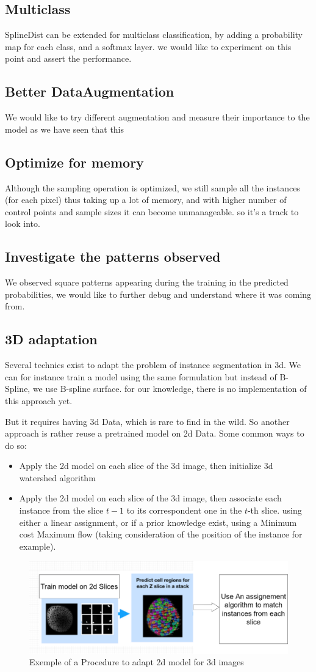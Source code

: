 \documentclass[main.tex]{subfiles}
\begin{document}
\subsection{Multiclass}
SplineDist can be extended for multiclass classification, by adding a probability map for each class, and a softmax layer. we would like to experiment on this point and assert the performance.
\subsection{Better DataAugmentation}
We would like to try different augmentation and measure their importance to the model as we have seen that this 
\subsection{Optimize for memory}
Although the sampling operation is optimized, we still sample all the instances (for each pixel) thus taking up a lot of memory, and with higher number of control points and sample sizes it can become unmanageable. so it's a track to look into.
\subsection{Investigate the patterns observed}
We observed square patterns appearing during the training in the predicted probabilities, we would like to further debug and understand where it was coming from. 
\subsection{3D adaptation}
Several technics exist to adapt the problem of instance segmentation in 3d. We can for instance train a model using the same formulation but instead of B-Spline, we use B-spline surface. for our knowledge, there is no implementation of this approach yet. 

But it requires having 3d Data, which is rare to find in the wild. So another approach is rather reuse a pretrained model on 2d Data. Some common ways to do so:

\begin{itemize}
    \item Apply the 2d model on each slice of the 3d image, then initialize 3d watershed algorithm
    \item Apply the 2d model on each slice of the 3d image, then associate each instance from the slice $t-1$ to its correspondent one in the $t$-th slice. using either a linear assignment, or if a prior knowledge exist, using a Minimum cost Maximum flow (taking consideration of the position of the instance for example). 
\end{itemize}

\begin{figure}[H]
    \centering
    \includegraphics[width=15cm]{presentationImages/slice.png}
    \caption{Exemple of a Procedure to adapt 2d model for 3d images}
\end{figure}
\end{document}
